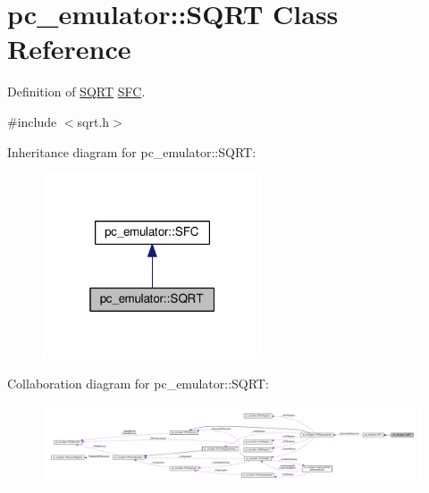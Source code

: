 \hypertarget{classpc__emulator_1_1SQRT}{}\section{pc\+\_\+emulator\+:\+:S\+Q\+RT Class Reference}
\label{classpc__emulator_1_1SQRT}


Definition of \hyperlink{classpc__emulator_1_1SQRT}{S\+Q\+RT} \hyperlink{classpc__emulator_1_1SFC}{S\+FC}.  




{\ttfamily \#include $<$sqrt.\+h$>$}



Inheritance diagram for pc\+\_\+emulator\+:\+:S\+Q\+RT\+:
\nopagebreak
\begin{figure}[H]
\begin{center}
\leavevmode
\includegraphics[width=184pt]{classpc__emulator_1_1SQRT__inherit__graph}
\end{center}
\end{figure}


Collaboration diagram for pc\+\_\+emulator\+:\+:S\+Q\+RT\+:
\nopagebreak
\begin{figure}[H]
\begin{center}
\leavevmode
\includegraphics[width=350pt]{classpc__emulator_1_1SQRT__coll__graph}
\end{center}
\end{figure}
